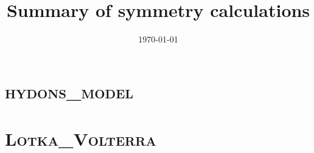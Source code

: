\documentclass{book}
\begin{document}
\title{\textbf{Summary of symmetry calculations}}
\date{\today}
\maketitle
\tableofcontents
\clearpage
%

\chapter{\textsc{hydons\_model}}


\chapter{\textsc{Lotka\_Volterra}}

\end{document}
